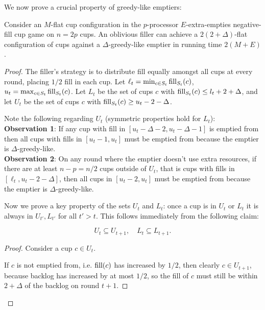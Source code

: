 We now prove a crucial property of greedy-like emptiers: 
\begin{proposition}
  \label{prop:greedylikeisflat}
  Consider an $M$-flat cup configuration in the $p$-processor
  $E$-extra-empties negative-fill cup game on $n = 2p$ cups. An
  oblivious filler can achieve a $2(2+\Delta)$-flat configuration
  of cups against a $\Delta$-greedy-like emptier in running time
  $2(M+E)$.
\end{proposition}
\begin{proof}
  The filler's strategy is to distribute fill equally amongst all
  cups at every round, placing $1/2$ fill in each cup.
  Let $\ell_t = \min_{c\in S_t} \operatorname{\textnormal{fill}}_{S_t}(c)$, $u_t = \max_{c\in S_t} \operatorname{\textnormal{fill}}_{S_t}(c)$. 
  Let $L_t$ be the set of cups $c$ with $\operatorname{\textnormal{fill}}_{S_t}(c) \le l_t+2+\Delta$, and let
  $U_t$ be the set of cups $c$ with $\operatorname{\textnormal{fill}}_{S_t}(c) \ge u_t-2-\Delta$.
  
  Note the following regarding $U_t$ (symmetric properties hold for $L_t$):\\
  \textbf{Observation 1}: If any cup with fill in $[u_t-\Delta-2,
  u_t-\Delta-1]$ is emptied from then all cups with fills in
  $[u_t-1, u_t]$ must be emptied from because the emptier is
  $\Delta$-greedy-like. \\
  \textbf{Observation 2}:
  On any round where the emptier doesn't use extra resources, if
  there are at least $n-p = n/2$ cups outside of $U_t$, that is cups
  with fills in $[\ell_t, u_t-2-\Delta]$, then all cups in
  $[u_t-2, u_t]$ must be emptied from because the emptier is
  $\Delta$-greedy-like.

  Now we prove a key property of the sets $U_t$ and $L_t$: once a cup is in
  $U_t$ or $L_t$ it is always in $U_{t'}, L_{t'}$ for all $t' > t$. This
  follows immediately from the following claim:
  \begin{clm}
    \label{clm:dontlosestuff}
    $$U_{t} \subseteq U_{t+1},\quad L_t \subseteq L_{t+1}.$$
  \end{clm}
  \begin{proof}
    Consider a cup $c\in U_t$.

    If $c$ is not emptied from, i.e. $\operatorname{\textnormal{fill}}(c)$ has increased by $1/2$, then
    clearly $c \in U_{t+1}$, because backlog has increased by at most $1/2$, so
    the fill of $c$ must still be within $2+\Delta$ of the backlog on round $t+1$. 


\end{proof}
\end{proof}
